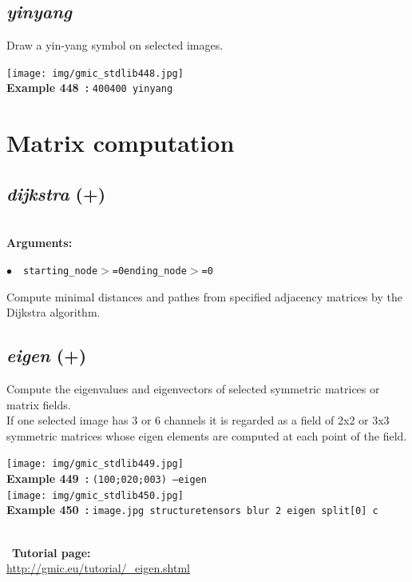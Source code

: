 \documentclass[a4paper,10.5pt,twoside]{book}
\def\comma{\discretionary{,}{}{,}}
\newcommand{\Cb}[1]{\textcolor{cb}{#1}}
\begin{document}
\subsection{\emph{yinyang} }\vspace*{-0.7em}
Draw a yin-yang symbol on selected images.
\begin{center}\texttt{[image: img/gmic\_stdlib448.jpg]}\\
{\footnotesize \textbf{Example 448~:} \texttt{400{\comma}400 yinyang}}
\end{center}
\section{Matrix computation}


\subsection{\emph{dijkstra} (+)}\vspace*{-0.7em}
~\\\textbf{\Cb{Arguments: }}\begin{flushleft}
{\small \Cb{\hspace*{0.5cm}$\bullet$~~\texttt{starting\_node$>$=0{\comma}ending\_node$>$=0}}}\end{flushleft}
Compute minimal distances and pathes from specified adjacency matrices by the Dijkstra algorithm.


\subsection{\emph{eigen} (+)}\vspace*{-0.7em}
Compute the eigenvalues and eigenvectors of selected symmetric matrices or matrix fields.
~\\If one selected image has 3 or 6 channels{\comma} it is regarded as a field of 2x2 or 3x3 symmetric matrices{\comma}
whose eigen elements are computed at each point of the field.
\begin{center}\texttt{[image: img/gmic\_stdlib449.jpg]}\\
{\footnotesize \textbf{Example 449~:} \texttt{(1{\comma}0{\comma}0;0{\comma}2{\comma}0;0{\comma}0{\comma}3) --eigen}}
\\\texttt{[image: img/gmic\_stdlib450.jpg]}\\
{\footnotesize \textbf{Example 450~:} \texttt{image.jpg structuretensors blur 2 eigen split[0] c}}
\end{center}
~\\
~\textbf{Tutorial page: }\\\url{http://gmic.eu/tutorial/\_eigen.shtml}
\end{document}
